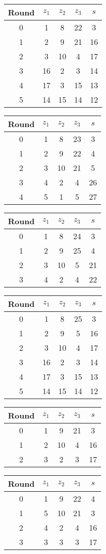 \begin{tabular}{c | c | c | c | c }
Round & $z_1$ & $z_2$ & $z_3$ & $s$ \\
\hline
0 & 1 & 8 & 22 & 3 \\
1 & 2 & 9 & 21 & 16 \\
2 & 3 & 10 & 4 & 17 \\
3 & 16 & 2 & 3 & 14 \\
4 & 17 & 3 & 15 & 13 \\
5 & 14 & 15 & 14 & 12
\end{tabular}

\begin{tabular}{c | c | c | c | c }
Round & $z_1$ & $z_2$ & $z_3$ & $s$ \\
\hline
0 & 1 & 8 & 23 & 3 \\
1 & 2 & 9 & 22 & 4 \\
2 & 3 & 10 & 21 & 5 \\
3 & 4 & 2 & 4 & 26 \\
4 & 5 & 1 & 5 & 27
\end{tabular}

\begin{tabular}{c | c | c | c | c }
Round & $z_1$ & $z_2$ & $z_3$ & $s$ \\
\hline
0 & 1 & 8 & 24 & 3 \\
1 & 2 & 9 & 25 & 4 \\
2 & 3 & 10 & 5 & 21 \\
3 & 4 & 2 & 4 & 22
\end{tabular}

\begin{tabular}{c | c | c | c | c }
Round & $z_1$ & $z_2$ & $z_3$ & $s$ \\
\hline
0 & 1 & 8 & 25 & 3 \\
1 & 2 & 9 & 5 & 16 \\
2 & 3 & 10 & 4 & 17 \\
3 & 16 & 2 & 3 & 14 \\
4 & 17 & 3 & 15 & 13 \\
5 & 14 & 15 & 14 & 12
\end{tabular}

\begin{tabular}{c | c | c | c | c }
Round & $z_1$ & $z_2$ & $z_3$ & $s$ \\
\hline
0 & 1 & 9 & 21 & 3 \\
1 & 2 & 10 & 4 & 16 \\
2 & 3 & 2 & 3 & 17
\end{tabular}

\begin{tabular}{c | c | c | c | c }
Round & $z_1$ & $z_2$ & $z_3$ & $s$ \\
\hline
0 & 1 & 9 & 22 & 4 \\
1 & 5 & 10 & 21 & 3 \\
2 & 4 & 2 & 4 & 16 \\
3 & 3 & 3 & 3 & 17
\end{tabular}

